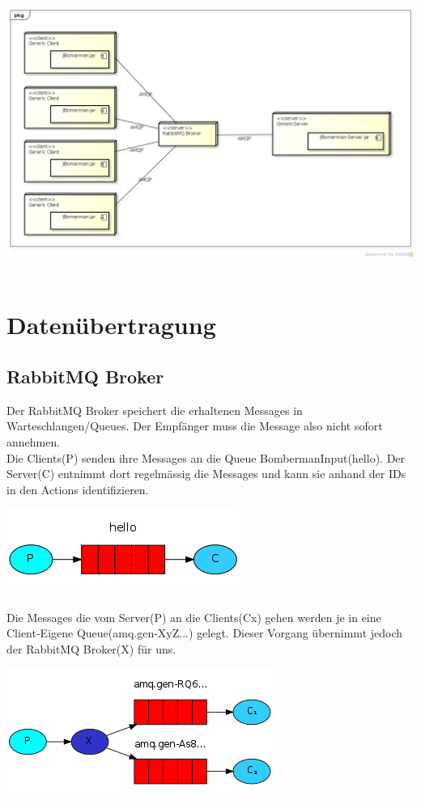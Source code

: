 \documentclass[11pt]{scrartcl}
\begin{document}
\includegraphics[scale=0.4]{DeploymentDiagram}
 
\newpage

\section{Datenübertragung}
\subsection{RabbitMQ Broker}
Der RabbitMQ Broker speichert die erhaltenen Messages in Warteschlangen/Queues. Der Empfänger muss die Message also nicht sofort annehmen. \\
Die Clients(P) senden ihre Messages an die Queue BombermanInput(hello). Der Server(C) entnimmt dort regelmässig die Messages und kann sie anhand der IDs in den Actions identifizieren.

\includegraphics[scale=1.0]{clientToServer}\\\\

Die Messages die vom Server(P) an die Clients(Cx) gehen werden je in eine Client-Eigene Queue(amq.gen-XyZ...) gelegt. Dieser Vorgang übernimmt jedoch der RabbitMQ Broker(X) für uns.

\includegraphics[scale=1.0]{serverToClient}\\
\end{document}
